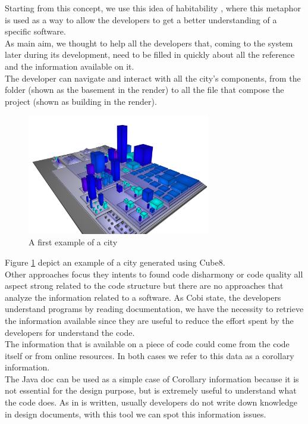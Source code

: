 \documentclass[]{usiinfbachelorproject}
\begin{document}
Starting from this concept, we use this idea of habitability \cite{vssac}, where this metaphor is used as a way to allow the developers to get a better understanding of a specific software. \\
As main aim, we thought to help all the developers that, coming to the system later during its development, need to be filled in quickly about all the reference and the information available on it.\\
The developer can navigate and interact with all the city's components, from the folder (shown as the basement in the render) to all the file that compose the project (shown as building in the render). \\

\begin{figure}[h]
	\centering
\includegraphics[width=8cm]{images/city1}

\caption{A first example of a city\label {fig:myO}}
\end{figure}
Figure \ref{fig:myO} depict an example of a city generated using Cube8.\\
Other approaches focus they intents to found code disharmony \cite{programComp} or code quality \cite{VVV} all aspect strong related to the code structure but there are no approaches that analyze the information related to a software. As Cobi \cite{Corbi} state, the developers understand programs by reading documentation, we have the necessity to retrieve the information available since they are useful to reduce the effort spent by the developers for understand the code.\\
The information that is available on a piece of code could come from the code itself or from online resources. In both cases we refer to this data as a corollary information.\\
The Java doc can be used as a simple case of Corollary information because it is not essential for the design purpose, but is extremely useful to understand what the code does. As in \cite{LaToza} is written, usually developers do not write down knowledge in design documents, with this tool we can spot this information issues.\\
\end{document}
